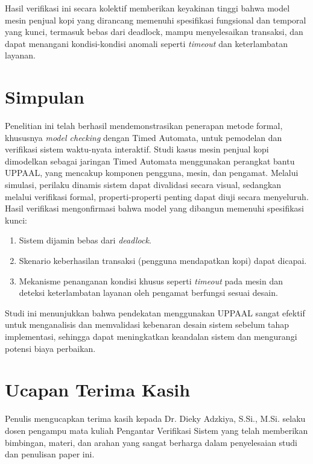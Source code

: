 \documentclass[12pt, a4paper]{article}
\begin{document}
Hasil verifikasi ini secara kolektif memberikan keyakinan tinggi bahwa model mesin penjual kopi yang dirancang memenuhi spesifikasi fungsional dan temporal yang kunci, termasuk bebas dari deadlock, mampu menyelesaikan transaksi, dan dapat menangani kondisi-kondisi anomali seperti \textit{timeout} dan keterlambatan layanan.

\section{Simpulan}
Penelitian ini telah berhasil mendemonstrasikan penerapan metode formal, khususnya \textit{model checking} dengan Timed Automata, untuk pemodelan dan verifikasi sistem waktu-nyata interaktif. Studi kasus mesin penjual kopi dimodelkan sebagai jaringan Timed Automata menggunakan perangkat bantu UPPAAL, yang mencakup komponen pengguna, mesin, dan pengamat.
Melalui simulasi, perilaku dinamis sistem dapat divalidasi secara visual, sedangkan melalui verifikasi formal, properti-properti penting dapat diuji secara menyeluruh. Hasil verifikasi mengonfirmasi bahwa model yang dibangun memenuhi spesifikasi kunci:
\begin{enumerate}
    \item Sistem dijamin bebas dari \textit{deadlock}.
    \item Skenario keberhasilan transaksi (pengguna mendapatkan kopi) dapat dicapai.
    \item Mekanisme penanganan kondisi khusus seperti \textit{timeout} pada mesin dan deteksi keterlambatan layanan oleh pengamat berfungsi sesuai desain.
\end{enumerate}
Studi ini menunjukkan bahwa pendekatan menggunakan UPPAAL sangat efektif untuk menganalisis dan memvalidasi kebenaran desain sistem sebelum tahap implementasi, sehingga dapat meningkatkan keandalan sistem dan mengurangi potensi biaya perbaikan.

\section*{Ucapan Terima Kasih}
Penulis mengucapkan terima kasih kepada Dr. Dieky Adzkiya, S.Si., M.Si. selaku dosen pengampu mata kuliah Pengantar Verifikasi Sistem yang telah memberikan bimbingan, materi, dan arahan yang sangat berharga dalam penyelesaian studi dan penulisan paper ini.

\printbibliography[title={Daftar Pustaka}]
\end{document}
